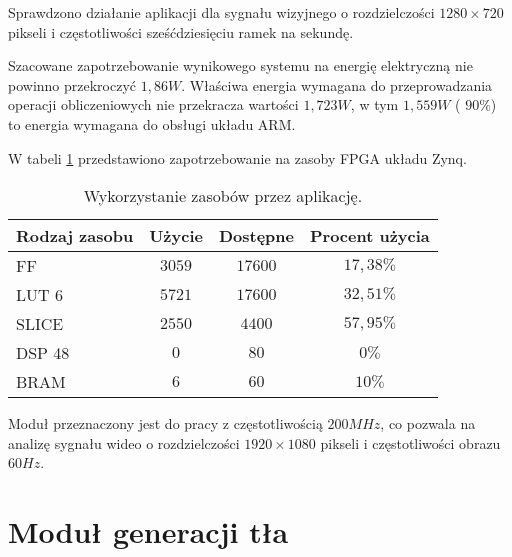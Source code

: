 Sprawdzono działanie aplikacji dla sygnału wizyjnego o rozdzielczości $1280 \times 720$ pikseli i częstotliwości sześćdziesięciu ramek na sekundę.

Szacowane zapotrzebowanie wynikowego systemu na energię elektryczną nie powinno przekroczyć $1,86W$. Właściwa energia wymagana do przeprowadzania operacji obliczeniowych nie przekracza wartości $1,723W$, w tym $1,559W$ ( $90\%$) to energia wymagana do obsługi układu ARM.

W tabeli \ref{tab;frame-difference-utilization} przedstawiono zapotrzebowanie na zasoby FPGA układu Zynq.

\begin{table}[h]
	\caption{Wykorzystanie zasobów przez aplikację.} %
	\centering
	\label{tab;frame-difference-utilization}
	\begin{tabular}{|l|c|c|c|}
		\hline
		\textbf{Rodzaj zasobu} & \textbf{Użycie} & \textbf{Dostępne} & \textbf{Procent użycia}      \\ \hline
		FF                     & $3059$            & $17600$             & $17,38\%$                 \\ \hline
		LUT 6                  & $5721$            & $17600$             & $32,51\%$                 \\ \hline
		SLICE                  & $2550$            & $4400$             & $57,95\%$                 \\ \hline
		DSP 48                 & $0$               & $80$                & $0\%$                    \\ \hline
		BRAM                   & $6$               & $60$                & $10\%$                   \\ \hline
	\end{tabular}
\end{table}

Moduł przeznaczony jest do pracy z częstotliwością $200MHz$, co pozwala na analizę sygnału wideo o rozdzielczości $1920 \times 1080$ pikseli i częstotliwości obrazu $60Hz$.



\section{Moduł generacji tła}

